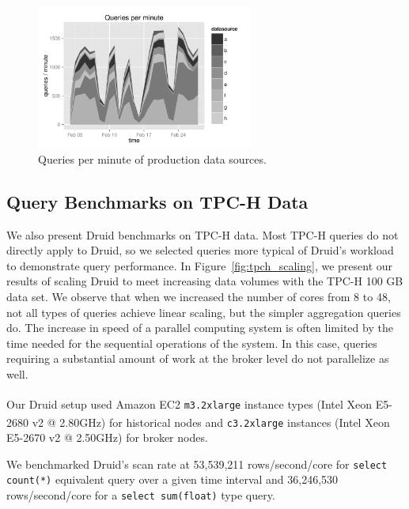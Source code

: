 \documentclass{vldb}
\begin{document}
{\begin{figure}
\centering
\includegraphics[width = 2.8in]{queries_per_min}
\caption{Queries per minute of production data sources.}
\label{fig:queries_per_min}
\end{figure}

\subsection{Query Benchmarks on TPC-H Data}
We also present Druid benchmarks on TPC-H data.  Most TPC-H queries do not
directly apply to Druid, so we selected queries more typical of Druid's
workload to demonstrate query performance. In Figure~\ref{fig:tpch_scaling}, we
present our results of scaling Druid to meet increasing data volumes with the
TPC-H 100 GB data set. We observe that when we increased the number of cores
from 8 to 48, not all types of queries achieve linear scaling, but the simpler
aggregation queries do. The increase in speed of a parallel computing system is
often limited by the time needed for the sequential operations of the system.
In this case, queries requiring a substantial amount of work at the broker
level do not parallelize as well.

Our Druid setup used Amazon EC2 \texttt{m3.2xlarge} instance types
(Intel\textsuperscript{\textregistered} Xeon\textsuperscript{\textregistered}
E5-2680 v2 @ 2.80GHz) for historical nodes and \texttt{c3.2xlarge} instances
(Intel\textsuperscript{\textregistered} Xeon\textsuperscript{\textregistered}
E5-2670 v2 @ 2.50GHz) for broker nodes. 

We benchmarked Druid's scan rate at 53,539,211
rows/second/core for \texttt{select count(*)} equivalent query over a given
time interval and 36,246,530 rows/second/core for a \texttt{select sum(float)}
type query.

}
\end{document}
